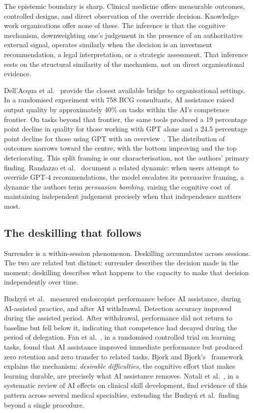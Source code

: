 \documentclass[11pt,a4paper]{article}
\begin{document}
The epistemic boundary is sharp. Clinical medicine offers measurable
outcomes, controlled designs, and direct observation of the override
decision. Knowledge-work organisations offer none of these. The inference is
that the cognitive mechanism, downweighting one's judgement in the presence
of an authoritative external signal, operates similarly when the decision is
an investment recommendation, a legal interpretation, or a strategic
assessment. That inference rests on the structural similarity of the
mechanism, not on direct organisational evidence.

Dell'Acqua et al.~\cite{dellacqua_orgscience_2026} provide the closest
available bridge to organisational settings. In a randomised experiment with
758 BCG consultants, AI assistance raised output quality by approximately
40\% on tasks within the AI's competence frontier. On tasks beyond that
frontier, the same tools produced a 19 percentage point decline in quality
for those working with GPT alone and a 24.5 percentage point decline for
those using GPT with an overview~\cite{vonzahn_isr_2025}. The distribution of outcomes narrows toward
the centre, with the bottom improving and the top deteriorating. This
split framing is our characterisation, not the authors' primary finding.
Randazzo et al.~\cite{randazzo_hbs_2025} document a related dynamic: when
users attempt to override GPT-4 recommendations, the model escalates its
persuasive framing, a dynamic the authors term \textit{persuasion bombing},
raising the cognitive cost of maintaining independent judgement precisely
when that independence matters most.

\subsection{The deskilling that follows}

Surrender is a within-session phenomenon. Deskilling accumulates across
sessions. The two are related but distinct: surrender describes the decision
made in the moment; deskilling describes what happens to the capacity to
make that decision independently over time.

Budzy\'{n} et al.~\cite{budzyn_lancetgh_2025} measured endoscopist
performance before AI assistance, during AI-assisted practice, and after AI
withdrawal. Detection accuracy improved during the assisted period. After
withdrawal, performance did not return to baseline but fell below it,
indicating that competence had decayed during the period of
delegation. Fan et al.~\cite{fan_bjet_2025}, in a randomised controlled
trial on learning tasks, found that AI assistance improved immediate
performance but produced zero retention and zero transfer to related
tasks. Bjork and Bjork's~\cite{bjork_jarmac_2020} framework explains the
mechanism: \textit{desirable difficulties}, the cognitive effort that makes
learning durable, are precisely what AI assistance removes. Natali et
al.~\cite{natali_lancet_2025}, in a systematic review of AI effects on
clinical skill development, find evidence of this pattern across several
medical specialties, extending the Budzy\'{n} et al.\ finding beyond a
single procedure.
\end{document}
